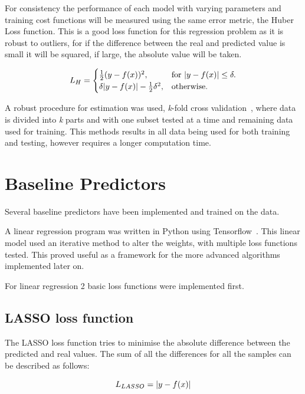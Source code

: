 \documentclass[10pt,twocolumn,letterpaper]{article}
\DeclarePairedDelimiter\abs{\lvert}{\rvert}%
\begin{document}
For consistency the performance of each model with varying parameters and training cost functions will be measured using the same error metric, the Huber Loss function. This is a good loss function for this regression problem as it is robust to outliers, for if the difference between the real and predicted value is small it will be squared, if large, the absolute value will be taken.

\begin{equation}
L_H = \begin{cases}
 \frac{1}{2} (y - f(x))^2, & \text{for\ } \abs{y - f(x)} \leq \delta. \\
 \delta \abs{y - f(x)} - \frac{1}{2} \delta^2, & \text{otherwise.}
\end{cases}
\label{eq:huber}
\end{equation}

A robust procedure for estimation was used, \textit{k}-fold cross validation~\cite{CrossValidation}, where data is divided into \textit{k} parts and with one subset tested at a time and remaining data used for training. This methods results in all data being used for both training and testing, however requires a longer computation time.

\section{Baseline Predictors}
Several baseline predictors have been implemented and trained on the data. 

A linear regression program was written in Python using Tensorflow~\cite{tensorflow2015-whitepaper}. This linear model used an iterative method to alter the weights, with multiple loss functions tested. This proved useful as a framework for the more advanced algorithms implemented later on.

For linear regression 2 basic loss functions were implemented first.

\subsection{LASSO loss function}
The LASSO loss function tries to minimise the absolute difference between the predicted and real values. The sum of all the differences for all the samples can be described as follows:

\begin{equation}
L_{LASSO} =  \abs{y - f(x)}
\label{eq:lasso}
\end{equation}
\end{document}
